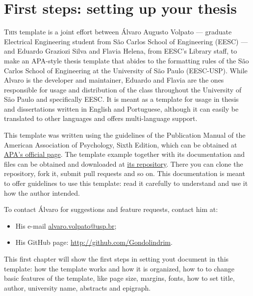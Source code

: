 \chapter{First steps: setting up your thesis}

	\lettrine{T}{his} template is a joint effort between Álvaro Augusto Volpato --- graduate Electrical Engineering student from São Carlos School of Engineering (EESC) --- and Eduardo Graziozi Silva and Flavia Helena, from EESC's Library staff, to make an APA-style thesis template that abides to the formatting rules of the São Carlos School of Engineering at the University of São Paulo (EESC-USP). While Alvaro is the developer and maintainer, Eduardo and Flavia are the ones responsible for usage and distribution of the class throughout the University of São Paulo and specifically EESC. It is meant as a template for usage in thesis and dissertations written in English and Portuguese, although it can easily be translated to other languages and offers multi-language support.

	This template was written using the guidelines of the Publication Manual of the American Association of Psychology, Sixth Edition, which can be obtained at \href{https://apastyle.apa.org/manual/}{APA's official page}. The template example together with its documentation and files can be obtained and downloaded at \href{http://github.com/Gondolindrim/apaThesis}{its repository}. There you can clone the repository, fork it, submit pull requests and so on. This documentation is meant to offer guidelines to use this template: read it carefully to understand and use it how the author intended.

	To contact Álvaro for suggestions and feature requests, contact him at:

\begin{itemize}
	\item His e-mail \url{alvaro.volpato@usp.br};
	\item His GitHub page: \url{http://github.com/Gondolindrim}.
\end{itemize}

	This first chapter will show the first steps in setting yout document in this template: how the template works and how it is organized, how to to change basic features of the template, like page size, margins, fonts, how to set title, author, university name, abstracts and epigraph.

